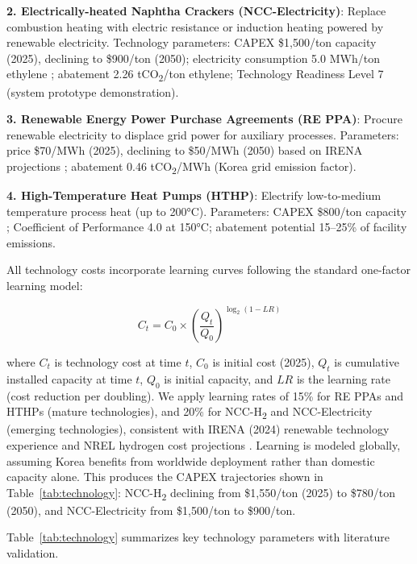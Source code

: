 \documentclass[11pt,a4paper]{article}
\begin{document}
\textbf{2. Electrically-heated Naphtha Crackers (NCC-Electricity)}: Replace combustion heating with electric resistance or induction heating powered by renewable electricity. Technology parameters: CAPEX \$1,500/ton capacity (2025), declining to \$900/ton (2050); electricity consumption 5.0 MWh/ton ethylene \citep{Smith2024,Jones2023}; abatement 2.26 tCO\textsubscript{2}/ton ethylene; Technology Readiness Level 7 (system prototype demonstration).

\textbf{3. Renewable Energy Power Purchase Agreements (RE PPA)}: Procure renewable electricity to displace grid power for auxiliary processes. Parameters: price \$70/MWh (2025), declining to \$50/MWh (2050) based on IRENA projections \citep{IRENA2024}; abatement 0.46 tCO\textsubscript{2}/MWh (Korea grid emission factor).

\textbf{4. High-Temperature Heat Pumps (HTHP)}: Electrify low-to-medium temperature process heat (up to 200°C). Parameters: CAPEX \$800/ton capacity \citep{Kosmadakis2020,Ciambellotti2024}; Coefficient of Performance 4.0 at 150°C; abatement potential 15--25\% of facility emissions.

All technology costs incorporate learning curves following the standard one-factor learning model:

\begin{equation}
C_t = C_0 \times \left(\frac{Q_t}{Q_0}\right)^{\log_2(1-LR)}
\label{eq:learning}
\end{equation}

\noindent where $C_t$ is technology cost at time $t$, $C_0$ is initial cost (2025), $Q_t$ is cumulative installed capacity at time $t$, $Q_0$ is initial capacity, and $LR$ is the learning rate (cost reduction per doubling). We apply learning rates of 15\% for RE PPAs and HTHPs (mature technologies), and 20\% for NCC-H\textsubscript{2} and NCC-Electricity (emerging technologies), consistent with IRENA (2024) renewable technology experience and NREL hydrogen cost projections \citep{IRENA2024}. Learning is modeled globally, assuming Korea benefits from worldwide deployment rather than domestic capacity alone. This produces the CAPEX trajectories shown in Table~\ref{tab:technology}: NCC-H\textsubscript{2} declining from \$1,550/ton (2025) to \$780/ton (2050), and NCC-Electricity from \$1,500/ton to \$900/ton.

Table~\ref{tab:technology} summarizes key technology parameters with literature validation.
\end{document}
